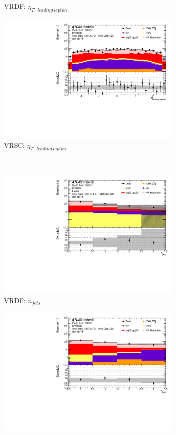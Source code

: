 \begin{figure}[htb]
\begin{subfigure}{.48\textwidth}
		\caption{VRDF: $\eta_{T,~leading~lepton}$}
    \end{subfigure}
    \begin{subfigure}{.48\textwidth}
        \centering
        \includegraphics[width = 0.85\linewidth]{figures/Analysis/Background/Overlay_VRSC_FFApplied_eta1.pdf}
        \caption{VRSC: $\eta_{T,~leading~lepton}$}
    \end{subfigure}\\
	\begin{subfigure}{.48\textwidth}
        \centering
        \includegraphics[width = 0.85\linewidth]{figures/Analysis/Background/Overlay_VRDF_FFApplied_n_jets.pdf}
        \caption{VRDF: $n_{jets}$}
    \end{subfigure}
    \begin{subfigure}{.48\textwidth}
        \centering
        \includegraphics[width = 0.85\linewidth]{figures/Analysis/Background/Overlay_VRSC_FFApplied_n_jets.pdf}

\end{subfigure}
\end{figure}
